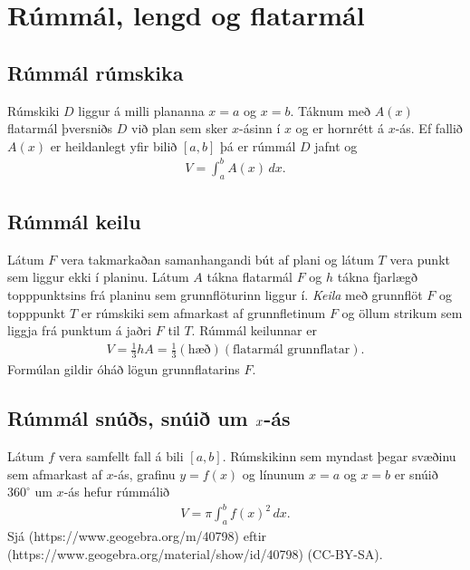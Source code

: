 \documentclass[b5paper,10pt,icelandic]{sphinxmanual}
\begin{document}

\section{Rúmmál, lengd og flatarmál}
\label{\detokenize{kafli07:index-1}}\label{\detokenize{kafli07:rummal-lengd-og-flatarmal}}

\subsection{Rúmmál rúmskika}
\label{\detokenize{kafli07:rummal-rumskika}}
Rúmskiki \(D\) liggur á milli plananna \(x=a\) og \(x=b\).
Táknum með \(A(x)\) flatarmál þversniðs \(D\) við plan sem sker
\(x\)-ásinn í \(x\) og er hornrétt á \(x\)-ás. Ef fallið
\(A(x)\) er heildanlegt yfir bilið \([a, b]\) þá er rúmmál
\(D\) jafnt og
\begin{equation*}
\begin{split}V=\int_a^b A(x)\,dx.\end{split}
\end{equation*}

\subsection{Rúmmál keilu}
\label{\detokenize{kafli07:index-2}}\label{\detokenize{kafli07:rummal-keilu}}
Látum \(F\) vera takmarkaðan samanhangandi bút af plani og látum
\(T\) vera punkt sem liggur ekki í planinu. Látum \(A\) tákna
flatarmál \(F\) og \(h\) tákna fjarlægð topppunktsins frá
planinu sem grunnflöturinn liggur í. \textit{Keila} með grunnflöt \(F\) og
topppunkt \(T\) er rúmskiki sem afmarkast af grunnfletinum \(F\)
og öllum strikum sem liggja frá punktum á jaðri \(F\) til \(T\).
Rúmmál keilunnar er
\begin{equation*}
\begin{split}V=\frac{1}{3}hA=\frac{1}{3}(\mbox{hæð})(\mbox{flatarmál
grunnflatar}).\end{split}
\end{equation*}
Formúlan gildir óháð lögun grunnflatarins \(F\).


\subsection{Rúmmál snúðs, snúið um \protect\(x\protect\)-ás}
\label{\detokenize{kafli07:index-3}}\label{\detokenize{kafli07:rummal-snus-snui-um-as}}
Látum \(f\) vera samfellt fall á bili \([a, b]\). Rúmskikinn sem
myndast þegar svæðinu sem afmarkast af \(x\)-ás, grafinu
\(y=f(x)\) og línunum \(x=a\) og \(x=b\) er snúið
\(360^\circ\) um \(x\)-ás hefur rúmmálið
\begin{equation*}
\begin{split}V=\pi\int_a^b f(x)^2\,dx.\end{split}
\end{equation*}
Sjá   (https://www.geogebra.org/m/40798)
eftir  (https://www.geogebra.org/material/show/id/40798) (CC-BY-SA).
\end{document}
